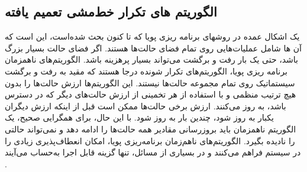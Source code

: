 %

\subsection{الگوریتم های تکرار خط‌مشی تعمیم یافته}


%
%
%
یک اشکال عمده در روشهای برنامه ریزی پویا که تا کنون بحث شده‌است، این است که آن ها شامل عملیات‌هایی روی تمام فضای حالت‌ها هستند.
اگر فضای حالت بسیار بزرگ باشد،
حتی یک بار رفت و برگشت می‌تواند بسیار پرهزینه باشد.
الگوریتم‌های ناهمزمان برنامه ریزی پویا، الگوریتم‌های تکرار شونده درجا هستند که مقید به رفت و برگشت سیستماتیک روی تمام مجموعه حالت‌ها نیستند. این الگوریتم‌ها ارزش حالت‌ها را بدون هیچ ترتیب منظمی ‌و با استفاده از هر تخمینی از ارزش حالت‌های دیگر که در دسترس باشد، به روز می‌کنند.
 ارزش برخی حالت‌ها ممکن است قبل از اینکه ارزش دیگران یکبار به روز شود، چندین بار به روز شود. با این حال، برای همگرایی صحیح، یک الگوریتم ناهمزمان باید بروزرسانی مقادیر همه حالت‌ها را ادامه دهد و نمی‌تواند حالتی را نادیده بگیرد.
الگوریتم‌های ناهم‌زمان برنامه‌ریزی پویا، امکان انعطاف‌پذیری زیادی را در سیستم فراهم می‌کنند و در بسیاری از مسائل، تنها گزینه قابل اجرا به‌حساب می‌آیند 
\cite{suttonbook}.
